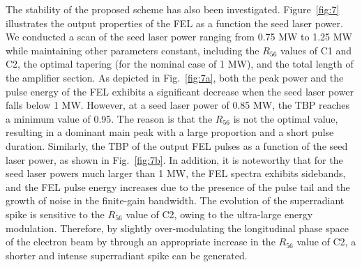 \documentclass[%
 reprint,
 amsmath,amssymb,
 aps,
]{revtex4-2}
\begin{document}
The stability of the proposed scheme has also been investigated. Figure~\ref{fig:7} illustrates the output properties of the FEL as a function the seed laser power. We conducted a scan of the seed laser power ranging from 0.75 MW to 1.25 MW while maintaining other parameters constant, including the $R_{56}$ values of C1 and C2, the optimal tapering (for the nominal case of 1 MW), and the total length of the amplifier section. As depicted in Fig.~\ref{fig:7a}, both the peak power and the pulse energy of the FEL exhibits a significant decrease when the seed laser power falls below 1 MW. However, at a seed laser power of 0.85 MW, the TBP reaches a minimum value of 0.95. The reason is that the $R_{56}$ is not the optimal value, resulting in a dominant main peak with a large proportion and a short pulse duration. Similarly, the TBP of the output FEL pulses as a function of the seed laser power, as shown in Fig.~\ref{fig:7b}. In addition, it is noteworthy that for the seed laser powers much larger than 1 MW, the FEL spectra exhibits sidebands, and the FEL pulse energy increases due to the presence of the pulse tail and the growth of noise in the finite-gain bandwidth. The evolution of the superradiant spike is sensitive to the $R_{56}$ value of C2, owing to the ultra-large energy modulation. Therefore, by slightly over-modulating the longitudinal phase space of the electron beam by through an appropriate increase in the $R_{56}$ value of C2, a shorter and intense superradiant spike can be generated.
\end{document}
